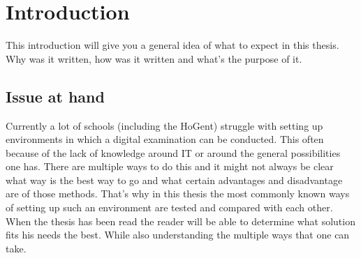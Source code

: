 
\chapter*{Introduction}
\label{ch:inleiding}

This introduction will give you a general idea of what to expect in this thesis. Why was it written, how was it written and what's the purpose of it. 

\section{Issue at hand}
\label{sec:probleemstelling}

Currently a lot of schools (including the HoGent) struggle with setting up environments in which a digital examination can be conducted. This often because of the lack of knowledge around IT or around the general possibilities one has. There are multiple ways to do this and it might not always be clear what way is the best way to go and what certain advantages and disadvantage are of those methods. That's why in this thesis the most commonly known ways of setting up such an environment are tested and compared with each other. When the thesis has been read the reader will be able to determine what solution fits his needs the best. While also understanding the multiple ways that one can take. 

